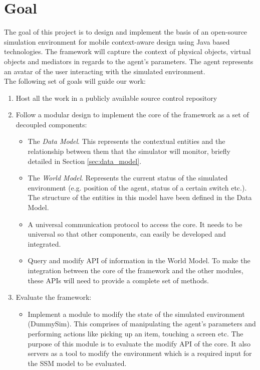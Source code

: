\section{Goal} %
\label{sec:goal}
The goal of this project is to design and implement the basis of an open-source simulation environment for mobile context-aware design using Java based technologies. The framework will capture the context of physical objects, virtual objects and mediators \cite{pederson2011situative} in regards to the agent's parameters. The agent represents an avatar of the user interacting with the simulated environment.\\

The following set of goals will guide our work:
\begin{enumerate}
	\item Host all the work in a publicly available source control repository
	\item Follow a modular design to implement the core of the framework as a set of decoupled components:
		\begin{itemize}
			\item The \emph{Data Model}. This represents the contextual entities and the relationship between them that the simulator will monitor, briefly detailed in Section \ref{sec:data_model}.
			\item The \emph{World Model}. Represents the current status of the simulated environment (e.g. position of the agent, status of a certain switch etc.). The structure of the entities in this model have been defined in the Data Model.
			\item A universal communication protocol to access the core. It needs to be universal so that other components, can easily be developed and integrated.
			\item Query and modify API of information in the World Model. To make the integration between the core of the framework and the other modules, these APIs will need to provide a complete set of methods.
		\end{itemize}
	\item Evaluate the framework:
		\begin{itemize}
			\item Implement a module to modify the state of the simulated environment (DummySim). This comprises of manipulating the agent's parameters and performing actions like picking up an item, touching a screen etc. The purpose of this module is to evaluate the modify API of the core. It also servers as a tool to modify the environment which is a required input for the SSM model to be evaluated.

\end{itemize}
\end{enumerate}

